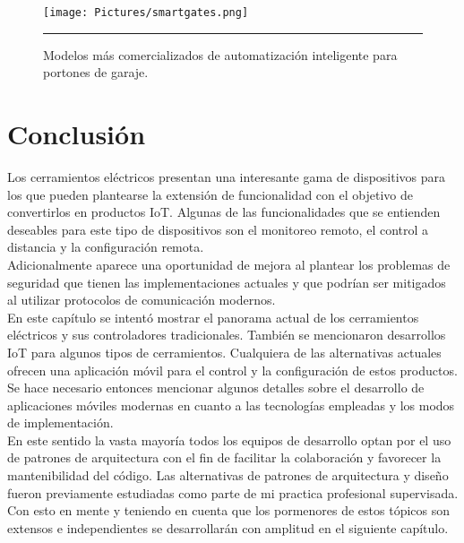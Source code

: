 \begin{figure}[htbp]
	\centering
	\texttt{[image: Pictures/smartgates.png]}
	\rule{35em}{1pt}
	\caption[Smart Garage Gates]{Modelos más comercializados de automatización inteligente para portones de garaje.}
	\label{fig:smartgates}
\end{figure}

\section{Conclusión}
Los cerramientos eléctricos presentan una interesante gama de dispositivos para los que pueden plantearse la extensión de funcionalidad con el objetivo de convertirlos en productos IoT. Algunas de las funcionalidades que se entienden deseables para este tipo de dispositivos son el monitoreo remoto, el control a distancia y la configuración remota.\\
Adicionalmente aparece una oportunidad de mejora al plantear los problemas de seguridad que tienen las implementaciones actuales y que podrían ser mitigados al utilizar protocolos de comunicación modernos.\\
En este capítulo se intentó mostrar el panorama actual de los cerramientos eléctricos y sus controladores tradicionales.
También se mencionaron desarrollos IoT para algunos tipos de cerramientos. Cualquiera de las alternativas actuales ofrecen una aplicación móvil para el control y la configuración de estos productos.
Se hace necesario entonces mencionar algunos detalles sobre el desarrollo de aplicaciones móviles modernas en cuanto a las tecnologías empleadas y los modos de implementación.\\
En este sentido la vasta mayoría todos los equipos de desarrollo optan por el uso de patrones de arquitectura con el fin de facilitar la colaboración y favorecer la mantenibilidad del código.
Las alternativas de patrones de arquitectura y diseño fueron previamente estudiadas como parte de mi practica profesional supervisada.\\
Con esto en mente y teniendo en cuenta que los pormenores de estos tópicos son extensos e independientes se desarrollarán con amplitud en el siguiente capítulo.

